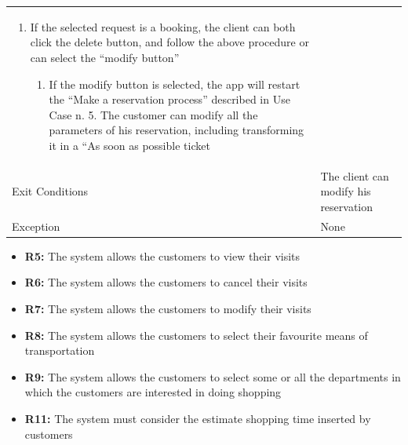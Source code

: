\documentclass{article}
\newcommand\xrowht[2][0]
{\addstackgap[.5\dimexpr#2\relax]{\vphantom{#1}}}
\begin{document}
\begin{center}
\begin{adjustwidth}{-2.8cm}{}
\begin{tabular}[h!]{|m{7.5em}|m{36em}|}
\begin{enumerate}
\begin{enumerate}
									\item If the selected request is a booking, the client can both click the delete button, and follow the above procedure or can select the “modify button”
									
									\begin{enumerate}
										
										\item If the modify button is selected, the app will restart the “Make a reservation process” described in Use Case n. 5. The customer can modify all the parameters of his reservation, including transforming it in a “As soon as possible ticket
										 
									\end{enumerate}
									
								\end{enumerate}
								
							\end{enumerate}\\
							\xrowht{5pt}
							Exit Conditions & The client can modify his reservation\\
							\xrowht{5pt}
							Exception & None\\	
							\hline
							
						\end{tabular}
					\end{adjustwidth}
					\begin{itemize}
						\medskip
						\newpage
						{\bfseries Required functional requirements: }
						
						
						\item {\bfseries R5: } The system allows the customers to view their visits
						\item {\bfseries R6: } The system allows the customers to cancel their visits
						\item {\bfseries R7: } The system allows the customers to modify their visits
						
						\item {\bfseries R8: } The system allows the customers to select their favourite means of transportation
						\item {\bfseries R9: } The system allows the customers to select some or all the departments in
						which the customers are interested in doing shopping
						\item {\bfseries R11: } The system must consider the estimate shopping time inserted by customers
						

\end{itemize}
\end{center}
\end{document}
